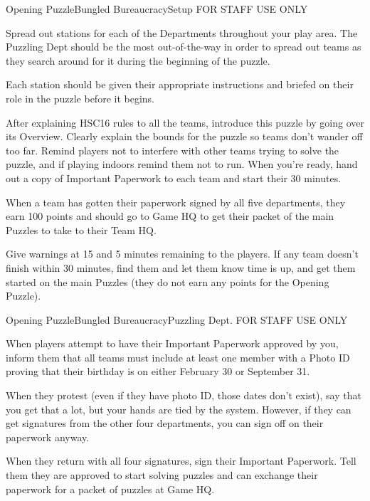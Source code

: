 \begin{customPuzzle}{Opening Puzzle}{Bungled Bureaucracy}{Setup}
  FOR STAFF USE ONLY

  Spread out stations for each of the Departments throughout your
  play area. The Puzzling Dept should be the most out-of-the-way in order
  to spread out teams as they search around for it
  during the beginning of the puzzle.

  Each station should be given their appropriate instructions and briefed
  on their role in the puzzle before it begins.

  After explaining HSC16 rules to all the teams, introduce this puzzle by
  going over its Overview. Clearly explain the bounds for the puzzle so teams
  don't wander off too far. Remind players not to interfere with other
  teams trying to solve the puzzle, and if playing
  indoors remind them not to run.
  When you're ready, hand out a copy of Important
  Paperwork to each team and start their 30 minutes.

  When a team has gotten their paperwork signed by all five departments,
  they earn 100 points and should go to Game HQ to get their packet of
  the main Puzzles to take to their Team HQ.

  Give warnings at 15 and 5 minutes remaining to the players. If any team
  doesn't finish within 30 minutes, find them and let them know time is up,
  and get them started on the main Puzzles (they do not earn any points for
  the Opening Puzzle).
\end{customPuzzle}

\begin{customPuzzle}{Opening Puzzle}{Bungled Bureaucracy}{Puzzling Dept.}
  FOR STAFF USE ONLY

  When players attempt to have their Important Paperwork approved by
  you, inform them that all teams must include at least
  one member with a Photo ID proving
  that their birthday is on either February 30 or September 31.

  When they protest (even if they have photo ID,
  those dates don't exist),
  say that you get that a lot, but your hands are tied by the system.
  However, if they
  can get signatures from the other four departments, you can sign off on their
  paperwork anyway.

  When they return with all four signatures, sign their Important Paperwork.
  Tell them they are approved to start solving puzzles and can
  exchange their paperwork for a packet of puzzles at Game HQ.
\end{customPuzzle}

